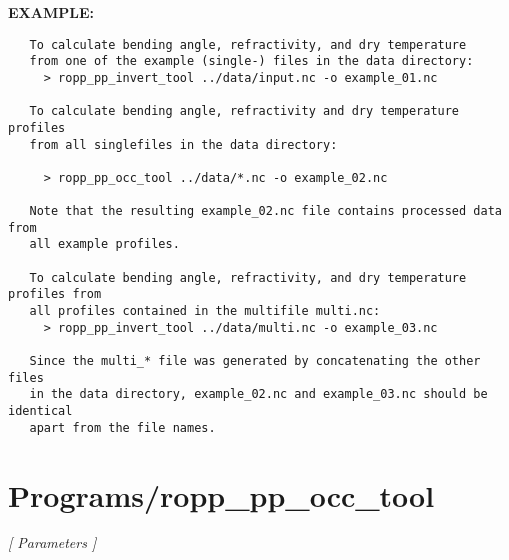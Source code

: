 \textbf{EXAMPLE:}\hspace{0.08in}\begin{Verbatim}
   To calculate bending angle, refractivity, and dry temperature 
   from one of the example (single-) files in the data directory:
     > ropp_pp_invert_tool ../data/input.nc -o example_01.nc

   To calculate bending angle, refractivity and dry temperature profiles
   from all singlefiles in the data directory:

     > ropp_pp_occ_tool ../data/*.nc -o example_02.nc

   Note that the resulting example_02.nc file contains processed data from
   all example profiles.

   To calculate bending angle, refractivity, and dry temperature profiles from
   all profiles contained in the multifile multi.nc:
     > ropp_pp_invert_tool ../data/multi.nc -o example_03.nc

   Since the multi_* file was generated by concatenating the other files
   in the data directory, example_02.nc and example_03.nc should be identical
   apart from the file names.
\end{Verbatim}
\section{Programs/ropp\_pp\_occ\_tool}
\textsl{[ Parameters ]}

